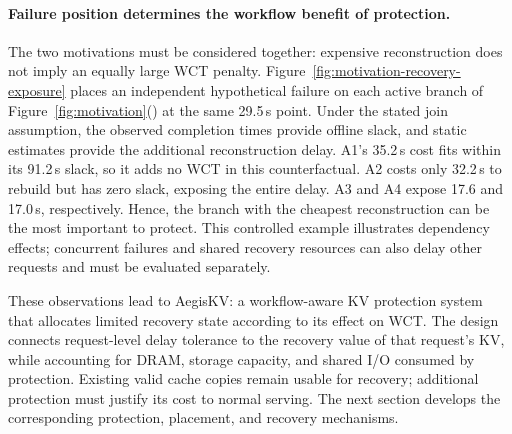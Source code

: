 \paragraph{Failure position determines the workflow benefit of protection.}
The two motivations must be considered together: expensive reconstruction
does not imply an equally large WCT penalty. Figure~\ref{fig:motivation-recovery-exposure}
places an independent hypothetical failure on each active branch of
Figure~\ref{fig:motivation}() at the same
29.5\,s point. Under the stated join assumption, the observed completion
times provide offline slack, and static estimates provide the additional
reconstruction delay. A1's 35.2\,s cost fits within its 91.2\,s slack,
so it adds no WCT in this counterfactual. A2 costs only 32.2\,s to rebuild
but has zero slack, exposing the entire delay. A3 and A4 expose 17.6 and
17.0\,s, respectively. Hence, the branch with the cheapest reconstruction
can be the most important to protect. This controlled example illustrates
dependency effects; concurrent failures and shared recovery resources can
also delay other requests and must be evaluated separately.

\label{sec:motivation-goals}
These observations lead to AegisKV: a workflow-aware KV protection system
that allocates limited recovery state according to its effect on WCT.
The design connects request-level delay tolerance to the recovery value
of that request's KV, while accounting for DRAM, storage capacity, and shared I/O
consumed by protection. Existing valid cache copies remain usable for
recovery; additional protection must justify its cost to normal serving.
The next section develops the corresponding protection, placement, and
recovery mechanisms.
